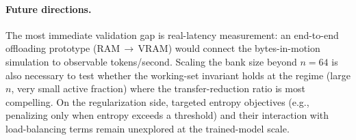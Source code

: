 \paragraph{Future directions.}
The most immediate validation gap is real-latency measurement: an end-to-end
offloading prototype (RAM\,$\to$\,VRAM) would connect the bytes-in-motion simulation to
observable tokens/second.
Scaling the bank size beyond $n = 64$ is also necessary to test whether the working-set
invariant holds at the regime (large $n$, very small active fraction) where the
transfer-reduction ratio is most compelling.
On the regularization side, targeted entropy objectives (e.g., penalizing only when entropy
exceeds a threshold) and their interaction with load-balancing terms remain unexplored at
the trained-model scale.
